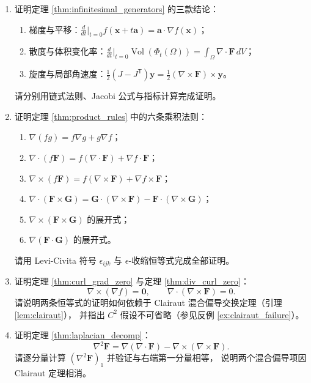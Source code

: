 \begin{enumerate}[leftmargin=3em, label=\textbf{题 \arabic*}]
    \item 证明定理 \ref{thm:infinitesimal_generators} 的三款结论：
    \begin{enumerate}[label=(\roman*)]
        \item 梯度与平移：$\frac{d}{dt}\big|_{t=0}f(\mathbf{x}+t\mathbf{a})=\mathbf{a}\cdot\nabla f(\mathbf{x})$；
        \item 散度与体积变化率：$\frac{d}{dt}\big|_{t=0}\operatorname{Vol}(\Phi_t(\Omega))=\int_\Omega\nabla\cdot\mathbf{F}\,dV$；
        \item 旋度与局部角速度：$\frac12(J-J^{\mathsf T})\mathbf{y}=\frac12(\nabla\times\mathbf{F})\times\mathbf{y}$。
    \end{enumerate}
    请分别用链式法则、Jacobi 公式与指标计算完成证明。

    \item 证明定理 \ref{thm:product_rules} 中的六条乘积法则：
    \begin{enumerate}[label=(\roman*)]
        \item $\nabla(fg)=f\nabla g+g\nabla f$；
        \item $\nabla\cdot(f\mathbf{F})=f(\nabla\cdot\mathbf{F})+\nabla f\cdot\mathbf{F}$；
        \item $\nabla\times(f\mathbf{F})=f(\nabla\times\mathbf{F})+\nabla f\times\mathbf{F}$；
        \item $\nabla\cdot(\mathbf{F}\times\mathbf{G})=\mathbf{G}\cdot(\nabla\times\mathbf{F})-\mathbf{F}\cdot(\nabla\times\mathbf{G})$；
        \item $\nabla\times(\mathbf{F}\times\mathbf{G})$ 的展开式；
        \item $\nabla(\mathbf{F}\cdot\mathbf{G})$ 的展开式。
    \end{enumerate}
    请用 Levi-Civita 符号 $\epsilon_{ijk}$ 与 $\epsilon$-收缩恒等式完成全部证明。

    \item 证明定理 \ref{thm:curl_grad_zero} 与定理 \ref{thm:div_curl_zero}：
    \[
    \nabla\times(\nabla f)=\mathbf{0},\qquad
    \nabla\cdot(\nabla\times\mathbf{F})=0.
    \]
    请说明两条恒等式的证明如何依赖于 Clairaut 混合偏导交换定理（引理 \ref{lem:clairaut}），
    并指出 $C^2$ 假设不可省略（参见反例 \ref{ex:clairaut_failure}）。

    \item 证明定理 \ref{thm:laplacian_decomp}：
    \[
    \nabla^2\mathbf{F}=\nabla(\nabla\cdot\mathbf{F})-\nabla\times(\nabla\times\mathbf{F}).
    \]
    请逐分量计算 $(\nabla^2\mathbf{F})_1$ 并验证与右端第一分量相等，
    说明两个混合偏导项因 Clairaut 定理相消。


\end{enumerate}
